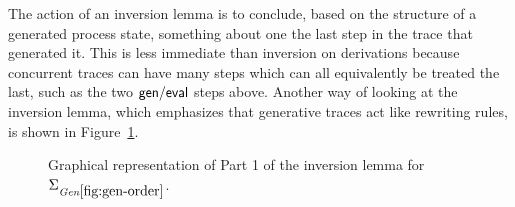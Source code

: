 The action of an inversion lemma is to conclude, based on the
structure of a generated process state, something about one the last
step in the trace that generated it. This is less immediate than
inversion on derivations because concurrent traces can have many steps
which can all equivalently be treated the last, such as the two ${\sf
  gen/eval}$ steps above. Another way of looking at the inversion
lemma, which emphasizes that generative traces act like rewriting
rules, is shown in Figure~\ref{fig:show-inversion}.

\begin{figure}
\begin{center}
\end{center}
\caption{Graphical representation of Part 1 of the inversion lemma
for $\siggenorder$.}\label{fig:show-inversion}
\end{figure}

